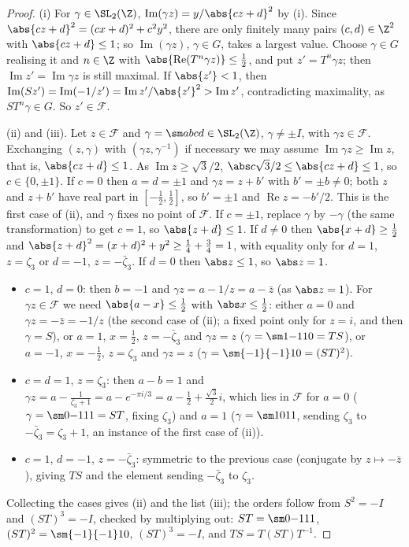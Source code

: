 \begin{proof}
(i) For $\gamma\in\SL_2(\Z)$, $\operatorname{Im}(\gamma z)=y/\abs{cz+d}^2$ by (i). Since $\abs{cz+d}^2=(cx+d)^2+c^2y^2$, there are only
finitely many pairs $(c,d)\in\Z^2$ with $\abs{cz+d}\le1$; so $\operatorname{Im}(\gamma z)$, $\gamma\in G$, takes a largest value. Choose $\gamma\in G$ realising it and $n\in\Z$
with $\abs{\operatorname{Re}(T^n\gamma z)}\le\frac12$, and put $z'=T^n\gamma z$; then $\operatorname{Im}z'=\operatorname{Im}\gamma z$ is still maximal. If $\abs{z'}<1$, then
$\operatorname{Im}(Sz')=\operatorname{Im}(-1/z')=\operatorname{Im}z'/\abs{z'}^2>\operatorname{Im}z'$, contradicting maximality, as $ST^n\gamma\in G$. So $z'\in\mathcal F$.

(ii) and (iii). Let $z\in\mathcal F$ and $\gamma=\sm abcd\in\SL_2(\Z)$, $\gamma\ne\pm I$, with $\gamma z\in\mathcal F$. Exchanging $(z,\gamma)$ with $(\gamma z,\gamma^{-1})$ if
necessary we may assume $\operatorname{Im}\gamma z\ge\operatorname{Im}z$, that is, $\abs{cz+d}\le1$. As $\operatorname{Im}z\ge\sqrt3/2$, $\abs c\sqrt3/2\le\abs{cz+d}\le1$, so
$c\in\{0,\pm1\}$.
If $c=0$ then $a=d=\pm1$ and $\gamma z=z+b'$ with $b'=\pm b\ne0$; both $z$ and $z+b'$ have real part in $[-\frac12,\frac12]$, so $b'=\pm1$ and
$\operatorname{Re}z=-b'/2$. This is the first case of (ii), and $\gamma$ fixes no point of $\mathcal F$.
If $c=\pm1$, replace $\gamma$ by $-\gamma$ (the same transformation) to get $c=1$, so $\abs{z+d}\le1$. If $d\ne0$ then $\abs{x+d}\ge\frac12$ and
$\abs{z+d}^2=(x+d)^2+y^2\ge\frac14+\frac34=1$, with equality only for $d=1$, $z=\zeta_3$ or $d=-1$, $z=-\bar\zeta_3$. If $d=0$ then $\abs z\le1$, so $\abs z=1$.
\begin{itemize}
\item $c=1$, $d=0$: then $b=-1$ and $\gamma z=a-1/z=a-\bar z$ (as $\abs z=1$). For $\gamma z\in\mathcal F$ we need $\abs{a-x}\le\frac12$ with $\abs x\le\frac12$: either
$a=0$ and $\gamma z=-\bar z=-1/z$ (the second case of (ii); a fixed point only for $z=i$, and then $\gamma=S$), or $a=1$, $x=\frac12$, $z=-\bar\zeta_3$ and
$\gamma z=z$ ($\gamma=\sm1{-1}10=TS$), or $a=-1$, $x=-\frac12$, $z=\zeta_3$ and $\gamma z=z$ ($\gamma=\sm{-1}{-1}10=(ST)^2$).
\item $c=d=1$, $z=\zeta_3$: then $a-b=1$ and $\gamma z=a-\frac1{\zeta_3+1}=a-e^{-\pi i/3}=a-\frac12+\frac{\sqrt3}2i$, which lies in $\mathcal F$ for $a=0$ ($\gamma=\sm0{-1}11=ST$,
fixing $\zeta_3$) and $a=1$ ($\gamma=\sm1011$, sending $\zeta_3$ to $-\bar\zeta_3=\zeta_3+1$, an instance of the first case of (ii)).
\item $c=1$, $d=-1$, $z=-\bar\zeta_3$: symmetric to the previous case (conjugate by $z\mapsto-\bar z$), giving $TS$ and the element sending $-\bar\zeta_3$
to $\zeta_3$.
\end{itemize}
Collecting the cases gives (ii) and the list (iii); the orders follow from $S^2=-I$ and $(ST)^3=-I$, checked by multiplying out:
$ST=\sm0{-1}11$, $(ST)^2=\sm{-1}{-1}10$, $(ST)^3=-I$, and $TS=T(ST)T^{-1}$.


\end{proof}
